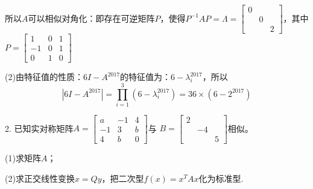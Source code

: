 \documentclass{article}
\begin{document}
\begin{jie}
所以$A$可以相似对角化：即存在可逆矩阵$P$，使得$P^{-1}AP=\Lambda=
\begin{bmatrix}
  0 &  &   \\
   &  0&   \\
   &  &  2
\end{bmatrix}
$，其中$P=
\begin{bmatrix}
  1 &  0&  1 \\
  -1 &  0&  1 \\
  0 &  1&  0
\end{bmatrix}
$

(2)由特征值的性质：$6I-A^{2017}$的特征值为：$6-\lambda_{i}^{2017}$，所以
\begin{equation*}
|6I-A^{2017}|=\prod_{i=1}^{3}(6-\lambda_ {i}^{2017})=36\times(6-2^{2017})
\end{equation*}
\end{jie}

2. 已知实对称矩阵$A=
\begin{bmatrix}
  a & -1 & 4 \\
  -1 & 3 & b\\
  4 & b & 0
\end{bmatrix}
$与
$B=
\begin{bmatrix}
  2 & ~ & ~ \\
  ~ & -4 & ~\\
  ~ & ~ & 5
\end{bmatrix}
$相似。

(1)求矩阵$A$；

(2)求正交线性变换$x=Qy$，把二次型$f(x)=x^{T}Ax$化为标准型.
\end{document}
